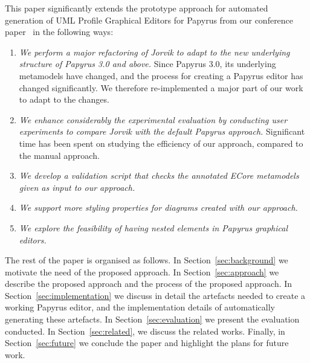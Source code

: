 This paper significantly extends the prototype approach for automated generation of UML Profile Graphical Editors for Papyrus from our conference paper~\cite{zolotas2018towards} in the following ways:
\begin{enumerate}
	\item \textit{We perform a major refactoring of Jorvik to adapt to the new underlying structure of Papyrus 3.0 and above.}
	Since Papyrus 3.0, its underlying metamodels have changed, and the process for creating a Papyrus editor has changed significantly. 
	We therefore re-implemented a major part of our work to adapt to the changes.
	\item \textit{We enhance considerably the experimental evaluation by conducting user experiments to compare Jorvik with the default Papyrus approach.}
	Significant time has been spent on studying the efficiency of our approach, compared to the manual approach.
	\item \textit{We develop a validation script that checks the annotated ECore metamodels given as input to our approach.}
	\item \textit{We support more styling properties for diagrams created with our approach.}
	\item \textit{We explore the feasibility of having nested elements in Papyrus graphical editors.} 
\end{enumerate}
The rest of the paper is organised as follows. 
In Section~\ref{sec:background} we motivate the need of the proposed approach. 
In Section~\ref{sec:approach} we describe the proposed approach and the process of the proposed approach. 
In Section~\ref{sec:implementation} we discuss in detail the artefacts needed to create a working Papyrus editor, and the implementation details of automatically generating these artefacts. 
In Section~\ref{sec:evaluation} we present the evaluation conducted.
In Section~\ref{sec:related}, we discuss the related works. 
Finally, in Section~\ref{sec:future} we conclude the paper and highlight the plans for future work.
